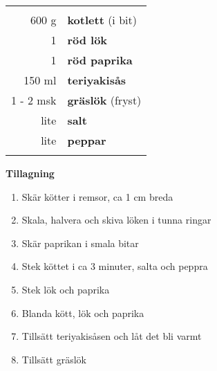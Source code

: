 \begin{table}[H]
	\begin{tabular}{rl}
	\hline
	&\\
		600 g & \textbf{kotlett} (i bit)\\
		1 & \textbf{röd lök}\\
		1 & \textbf{röd paprika}\\
		150 ml & \textbf{teriyakisås}\\
		1 - 2 msk & \textbf{gräslök} (fryst)\\
		lite & \textbf{salt}\\
		lite & \textbf{peppar}\\		
	&\\
	\hline
	\end{tabular}
\end{table}


\begin{multicols*}{2}

\noindent \textbf{Tillagning}
\begin{enumerate}
	\itemsep0cm
	\item Skär kötter i remsor, ca 1 cm breda
	\item Skala, halvera och skiva löken i tunna ringar
	\item Skär paprikan i smala bitar
	\item Stek köttet i ca 3 minuter, salta och peppra
	\item Stek lök och paprika
	\item Blanda kött, lök och paprika
	\item Tillsätt teriyakisåsen och låt det bli varmt
	\item Tillsätt gräslök
\end{enumerate}

\end{multicols*}

\clearpage